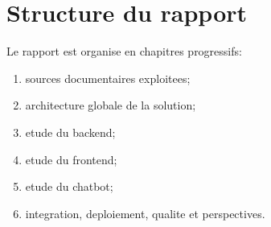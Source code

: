 \section{Structure du rapport}

Le rapport est organise en chapitres progressifs:
\begin{enumerate}[leftmargin=*]
  \item sources documentaires exploitees;
  \item architecture globale de la solution;
  \item etude du backend;
  \item etude du frontend;
  \item etude du chatbot;
  \item integration, deploiement, qualite et perspectives.
\end{enumerate}
